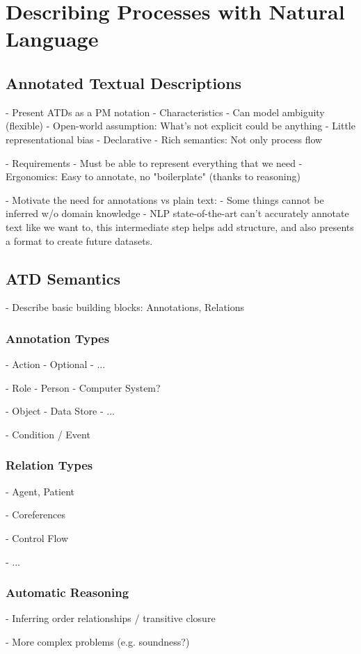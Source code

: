 \chapter{Describing Processes with Natural Language}
\label{cha:atd}

\section{Annotated Textual Descriptions}



- Present ATDs as a PM notation
- Characteristics
  - Can model ambiguity (flexible)
  - Open-world assumption: What's not explicit could be anything
  - Little representational bias 
  - Declarative 
  - Rich semantics: Not only process flow
  
- Requirements
  - Must be able to represent everything that we need
  - Ergonomics: Easy to annotate, no "boilerplate" (thanks to reasoning)

- Motivate the need for annotations vs plain text:
  - Some things cannot be inferred w/o domain knowledge
  - NLP state-of-the-art can't accurately annotate text like we want to, this
  intermediate step helps add structure, and also presents a format to create
  future datasets.

\section{ATD Semantics}

- Describe basic building blocks: Annotations, Relations
  
\subsection{Annotation Types}

- Action
  - Optional
  - ...
 
- Role
  - Person
  - Computer System?

- Object
  - Data Store
  - ...

- Condition / Event


\subsection{Relation Types}

- Agent, Patient

- Coreferences

- Control Flow

- ...

\subsection{Automatic Reasoning}

- Inferring order relationships / transitive closure

- More complex problems (e.g. soundness?)



